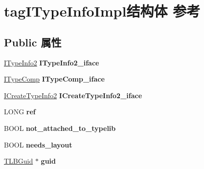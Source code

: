 \hypertarget{structtag_i_type_info_impl}{}\section{tag\+I\+Type\+Info\+Impl结构体 参考}
\label{structtag_i_type_info_impl}
\subsection*{Public 属性}
\begin{DoxyCompactItemize}
\item 
\mbox{\label{structtag_i_type_info_impl_a5797b404c3b9f3adfb3af4dc598019aa}} 
\hyperlink{interface_i_type_info2}{I\+Type\+Info2} {\bfseries I\+Type\+Info2\+\_\+iface}
\item 
\mbox{\label{structtag_i_type_info_impl_abc6b2e7f459ae199ccdf2d49a2fa4600}} 
\hyperlink{interface_i_type_comp}{I\+Type\+Comp} {\bfseries I\+Type\+Comp\+\_\+iface}
\item 
\mbox{\label{structtag_i_type_info_impl_ae22ed8bd4eb2b1057ef883f64a5e37a3}} 
\hyperlink{interface_i_create_type_info2}{I\+Create\+Type\+Info2} {\bfseries I\+Create\+Type\+Info2\+\_\+iface}
\item 
\mbox{\label{structtag_i_type_info_impl_a56636ab908e1f976f1c6b080e64af495}} 
L\+O\+NG {\bfseries ref}
\item 
\mbox{\label{structtag_i_type_info_impl_a31adda106421a8d9d45954fa9f60c669}} 
B\+O\+OL {\bfseries not\+\_\+attached\+\_\+to\+\_\+typelib}
\item 
\mbox{\label{structtag_i_type_info_impl_a6fa55669ae814ed2fd2bfb2ff1b37113}} 
B\+O\+OL {\bfseries needs\+\_\+layout}
\item 
\mbox{\label{structtag_i_type_info_impl_ad05ff134c4483cd5f75eb7cd8fb92c98}} 
\hyperlink{structtag_t_l_b_guid}{T\+L\+B\+Guid} $\ast$ {\bfseries guid}
\item 
\mbox{\label{structtag_i_type_info_impl_a633c8b04938b741e4d2e286b01172f67}} 

\end{DoxyCompactItemize}
